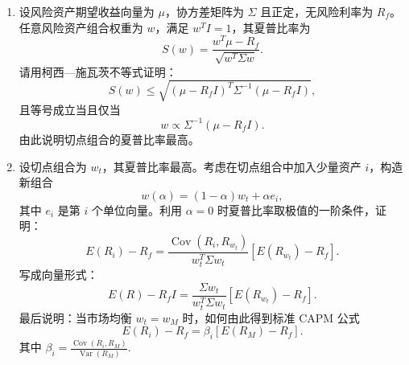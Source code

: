\documentclass{article}
\begin{document}
\begin{enumerate}[label=\textbf{\arabic*.}]
\item 设风险资产期望收益向量为 \(\mu\)，协方差矩阵为 \(\Sigma\) 且正定，无风险利率为 \(R_f\)。任意风险资产组合权重为 \(w\)，满足 \(w^T I=1\)，其夏普比率为
\[
S(w)=\frac{w^T\mu-R_f}{\sqrt{w^T\Sigma w}}.
\]
请用柯西—施瓦茨不等式证明：
\[
S(w)\le \sqrt{(\mu-R_f I)^T\Sigma^{-1}(\mu-R_f I)},
\]
且等号成立当且仅当
\[
w\propto \Sigma^{-1}(\mu-R_f I).
\]
由此说明切点组合的夏普比率最高。

\item 设切点组合为 \(w_t\)，其夏普比率最高。考虑在切点组合中加入少量资产 \(i\)，构造新组合
\[
w(\alpha)=(1-\alpha)w_t+\alpha e_i,
\]
其中 \(e_i\) 是第 \(i\) 个单位向量。利用 \(\alpha=0\) 时夏普比率取极值的一阶条件，证明：
\[
E(R_i)-R_f
=
\frac{\operatorname{Cov}(R_i,R_{w_t})}{w_t^T\Sigma w_t}
[E(R_{w_t})-R_f].
\]
写成向量形式：
\[
E(R)-R_f I
=
\frac{\Sigma w_t}{w_t^T\Sigma w_t}
[E(R_{w_t})-R_f].
\]
最后说明：当市场均衡 \(w_t=w_M\) 时，如何由此得到标准 CAPM 公式
\[
E(R_i)-R_f=\beta_i[E(R_M)-R_f].
\]
其中 \(\beta_i=\frac{\operatorname{Cov}(R_i,R_M)}{\operatorname{Var}(R_M)}. \)


\end{enumerate}
\end{document}
